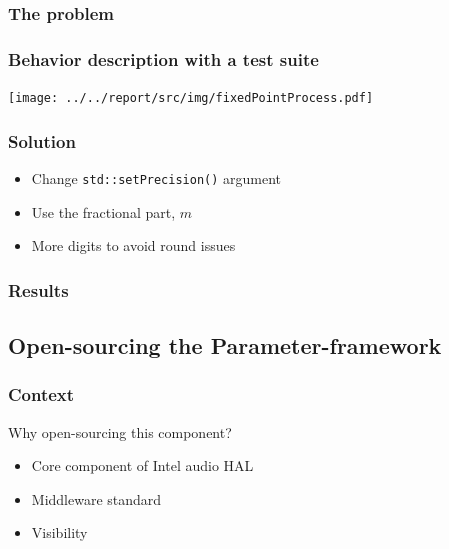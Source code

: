 \begin{frame}
    \frametitle{The problem}
    
\end{frame}

\begin{frame}
    \frametitle{Behavior description with a test suite}
    \centering
    \texttt{[image: ../../report/src/img/fixedPointProcess.pdf]}
\end{frame}

\begin{frame}
    \frametitle{Solution}
    \begin{itemize}
        \item Change \lstinline{std::setPrecision()} argument
        \item Use the fractional part, $m$
        \item More digits to avoid round issues
    \end{itemize}
\end{frame}


\begin{frame}
    \frametitle{Results}
    
\end{frame}

\subsection{Open-sourcing the Parameter-framework}
\subsubsection{Context}
\begin{FrameWithSubSection}
    \begin{block}{Why open-sourcing this component?}
        \begin{itemize}
            \item Core component of Intel audio HAL
            \item Middleware standard
            \item Visibility
        \end{itemize}
    \end{block}
\end{FrameWithSubSection}

